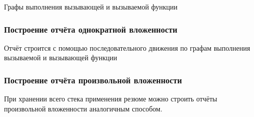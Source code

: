 \documentclass[hyperref={pdfpagelabels=false}]{beamer}
\begin{document}

\begin{frame}
Графы выполнения вызывающей и вызываемой функции
\frametitle{Построение отчёта однократной вложенности}
Отчёт строится с помощью последовательного движения по графам выполнения вызываемой и вызывающей функции
\begin{figure}[H]
\end{figure}
\end{frame}

\begin{frame}
\frametitle{Построение отчёта произвольной вложенности}
При хранении всего стека применения резюме можно строить отчёты произвольной вложенности аналогичным способом.
\begin{figure}[h]
\end{figure}
\end{frame}
\end{document}
